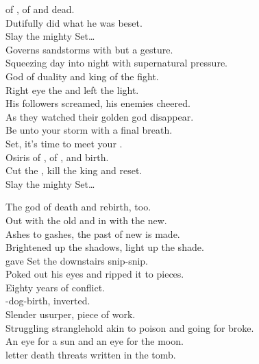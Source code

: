  of , of  and dead. \\
Dutifully did what he was beset. \\

Slay the mighty Set… \\

Governs sandstorms with but a gesture. \\
Squeezing day into night with supernatural pressure. \\
God of duality and king of the fight. \\
Right eye the  and left the  light. \\

His followers screamed, his enemies cheered. \\
As they watched their golden god disappear. \\
Be unto your storm with a final breath. \\
Set, it's time to meet your . \\

Osiris of , of , and birth. \\
Cut the , kill the king and reset. \\

Slay the mighty Set… \\


The god of death and rebirth, too. \\
Out with the old and in with the new. \\
Ashes to gashes, the past of new  is made. \\
Brightened up the shadows, light up the shade. \\
 gave Set the downstairs snip-snip. \\
Poked out his eyes and ripped it to pieces. \\
Eighty years of conflict. \\

-dog-birth,  inverted. \\
Slender usurper, piece of work. \\
Struggling stranglehold akin to poison and going for broke. \\
An eye for a sun and an eye for the moon. \\
 letter death threats written in the tomb. \\

